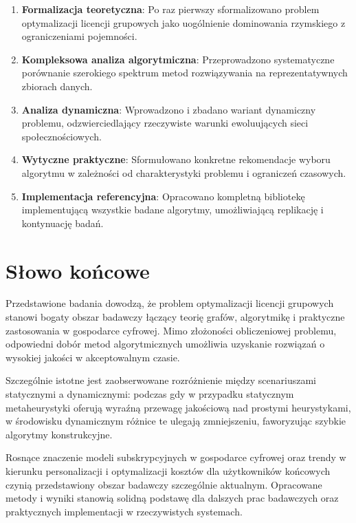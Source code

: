 \begin{enumerate}
\item \textbf{Formalizacja teoretyczna}: Po raz pierwszy sformalizowano problem optymalizacji licencji grupowych jako uogólnienie dominowania rzymskiego z ograniczeniami pojemności.

\item \textbf{Kompleksowa analiza algorytmiczna}: Przeprowadzono systematyczne porównanie szerokiego spektrum metod rozwiązywania na reprezentatywnych zbiorach danych.

\item \textbf{Analiza dynamiczna}: Wprowadzono i zbadano wariant dynamiczny problemu, odzwierciedlający rzeczywiste warunki ewoluujących sieci społecznościowych.

\item \textbf{Wytyczne praktyczne}: Sformułowano konkretne rekomendacje wyboru algorytmu w zależności od charakterystyki problemu i ograniczeń czasowych.

\item \textbf{Implementacja referencyjna}: Opracowano kompletną bibliotekę implementującą wszystkie badane algorytmy, umożliwiającą replikację i kontynuację badań.
\end{enumerate}

\section{Słowo końcowe}

Przedstawione badania dowodzą, że problem optymalizacji licencji grupowych stanowi bogaty obszar badawczy łączący teorię grafów, algorytmikę i praktyczne zastosowania w gospodarce cyfrowej. Mimo złożoności obliczeniowej problemu, odpowiedni dobór metod algorytmicznych umożliwia uzyskanie rozwiązań o wysokiej jakości w akceptowalnym czasie.

Szczególnie istotne jest zaobserwowane rozróżnienie między scenariuszami statycznymi a dynamicznymi: podczas gdy w przypadku statycznym metaheurystyki oferują wyraźną przewagę jakościową nad prostymi heurystykami, w środowisku dynamicznym różnice te ulegają zmniejszeniu, faworyzując szybkie algorytmy konstrukcyjne.

Rosnące znaczenie modeli subskrypcyjnych w gospodarce cyfrowej oraz trendy w kierunku personalizacji i optymalizacji kosztów dla użytkowników końcowych czynią przedstawiony obszar badawczy szczególnie aktualnym. Opracowane metody i wyniki stanowią solidną podstawę dla dalszych prac badawczych oraz praktycznych implementacji w rzeczywistych systemach.
